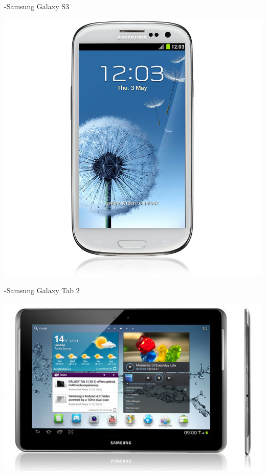 -Samsung Galaxy S3

\begin{center}
\includegraphics[width=1\textwidth]{imgs/galaxy_s3.jpg}
\label{galaxys3_img}%
\end{center}
\newpage

-Samsung Galaxy Tab 2

\begin{center}
\includegraphics[width=1\textwidth]{imgs/galaxy_tab_2.jpg}
\label{galaxy_tab_2_img}%
\end{center}

